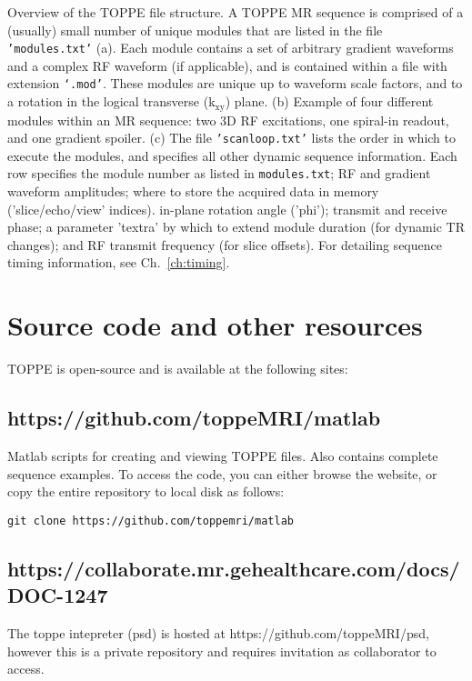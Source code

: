 {
Overview of the TOPPE file structure.
A TOPPE MR sequence is comprised of a (usually) small number of unique modules that are listed in the file \texttt{'modules.txt'} (a).
Each module contains a set of arbitrary gradient waveforms and a complex RF waveform (if applicable), and is contained within a file with extension \texttt{`.mod'}.
These modules are unique up to waveform scale factors, and to a rotation in the logical transverse (k$_\textrm{xy}$) plane.
(b) Example of four different modules within an MR sequence: two 3D RF excitations, one spiral-in readout, and one gradient spoiler.
(c) The file \texttt{'scanloop.txt'} lists the order in which to execute the modules, and specifies all other dynamic sequence information.
Each row specifies the module number as listed in \texttt{modules.txt}; RF and gradient waveform amplitudes;
where to store the acquired data in memory ('slice/echo/view' indices).
in-plane rotation angle ('phi');
transmit and receive phase;
a parameter 'textra' by which to extend module duration (for dynamic TR changes);
and RF transmit frequency (for slice offsets).
For detailing sequence timing information, see Ch.~\ref{ch:timing}.
}


\section{Source code and other resources}

TOPPE is open-source and is available at the following sites:

\subsection{https://github.com/toppeMRI/matlab}

Matlab scripts for creating and viewing TOPPE files. Also contains complete sequence examples.
To access the code, you can either browse the website, or copy the entire repository to local disk as follows:

\begin{lstlisting}
git clone https://github.com/toppemri/matlab
\end{lstlisting}


\subsection{https://collaborate.mr.gehealthcare.com/docs/DOC-1247}

The toppe intepreter (psd) is hosted at {https://github.com/toppeMRI/psd}, however this is a private repository and requires invitation as collaborator to access.

